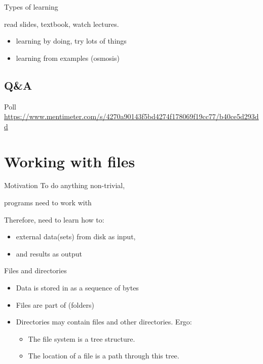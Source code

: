 \documentclass[aspectratio=169,usenames,dvipsnames]{beamer}
\begin{document}
\begin{frame}{Types of learning}
    \begin{description}
        \item[Explicit learning]
            read slides, textbook, watch lectures.
        \item[Implicit learning]
            \begin{itemize}
                \item learning by doing, try lots of things
                \item learning from examples (osmosis)
            \end{itemize}
    \end{description}
\end{frame}

\subsection{Q\&A}
\begin{frame}{Poll}
    \centering\small
    \url{https://www.mentimeter.com/s/4270a90143f5bd4274f178069f19cc77/b40ce5d293dd}
\end{frame}



\section{Working with files}
\frame{\tableofcontents[currentsection]}

\begin{frame}{Motivation}
    To do anything non-trivial,

    programs need to work with 

    \pause
    Therefore, need to learn how to:

	\begin{itemize}
		\item {} external data(sets) from disk as input,
		\item and  results as output
	\end{itemize}

\end{frame}


\begin{frame}{Files and directories}
    \begin{itemize}
        \item Data is stored in  as a sequence of bytes
        \item Files are part of  (folders)
        \item Directories may contain files and other directories. Ergo:
            \begin{itemize}
                \item The file system is a tree structure.
                \item The location of a file is a path through this tree.
            \end{itemize}
    \end{itemize}
\end{frame}
\end{document}
